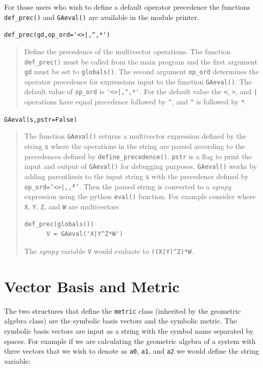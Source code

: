 \documentclass[12pt]{report}
\newcommand{\T}[1]{\texttt{#1}}
\begin{document}
For those users who wish to define a default operator precedence the functions
\T{def\_prec()} and \T{GAeval()} are available in the module printer.

   \lstinline$def_prec(gd,op_ord='<>|,^,*')$
   \begin{quote}
   Define the precedence of the multivector operations.  The function
   \T{def\_prec()} must be called from the main program and the
   first argument \T{gd} must be set to \T{globals()}.  The second argument
   \T{op\_ord} determines the operator precedence for expressions input to
   the function \T{GAeval()}. The default value of \T{op\_ord} is \lstinline$'<>|,^,*'$.
   For the default value the \T{<}, \T{>}, and \T{|} operations have equal
   precedence followed by \T{\^}, and \T{\^} is followed by \T{*}.
   \end{quote}
  
   \T{GAeval(s,pstr=False)}
   \begin{quote}
   The function \T{GAeval()} returns a multivector expression defined by the
   string \T{s} where the operations in the string are parsed according to
   the precedences defined by \T{define\_precedence()}. \T{pstr} is a flag
   to print the input and output of \T{GAeval()} for debugging purposes.
   \T{GAeval()} works by adding parenthesis to the input string \T{s} with the
   precedence defined by \T{op\_ord='<>|,\^,*'}.  Then the parsed string is
   converted to a \emph{sympy} expression using the python \T{eval()} function.
   For example consider where \T{X}, \T{Y}, \T{Z}, and \T{W} are multivectors

	\begin{lstlisting}[numbers=none]
      def_prec(globals())
      V = GAeval('X|Y^Z*W')
	\end{lstlisting}
	
   The \emph{sympy} variable \T{V} would evaluate to \lstinline!((X|Y)^Z)*W!.
   \end{quote}

\section{Vector Basis and Metric}\label{BasisMetric}

The two structures that define the \T{metric} class (inherited by the 
geometric algebra class) are the
symbolic basis vectors and the symbolic metric.  The symbolic basis
vectors are input as a string with the symbol name separated by spaces.  For
example if we are calculating the geometric algebra of a system with three
vectors that we wish to denote as \T{a0}, \T{a1}, and \T{a2} we would define the
string variable:
\end{document}
